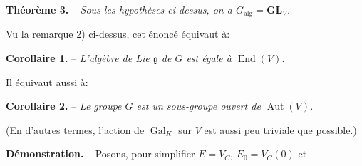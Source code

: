 \textbf{Théorème 3.} -- \textit{Sous les hypothèses ci-dessus, on a $G_{\mathrm{alg}}=\mathbf{GL}_V$.}

Vu la remarque 2) ci-dessus, cet énoncé équivaut à:

\textbf{Corollaire 1.} -- \textit{L'algèbre de Lie $\mathfrak g$ de $G$ est égale à $\operatorname{End}(V)$.}

Il équivaut aussi à:

\textbf{Corollaire 2.} -- \textit{Le groupe $G$ est un sous-groupe ouvert de $\operatorname{Aut}(V)$.}

(En d'autres termes, l'action de $\operatorname{Gal}_K$ sur $V$ est aussi peu triviale que possible.)

\textbf{Démonstration.} -- Posons, pour simplifier $E=V_C$, $E_0=V_C(0)$ et
